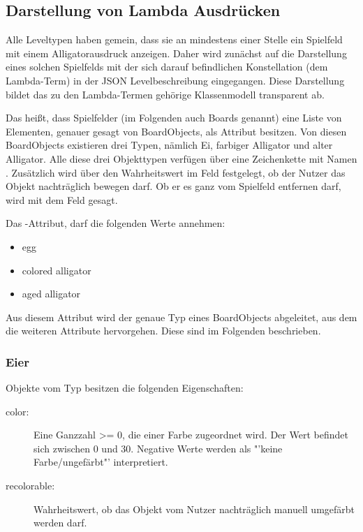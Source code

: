 \subsection{Darstellung von Lambda Ausdrücken}
Alle Leveltypen haben gemein, dass sie an mindestens einer Stelle ein Spielfeld mit einem Alligatorausdruck anzeigen.
Daher wird zunächst auf die Darstellung eines solchen Spielfelds mit der sich darauf befindlichen Konstellation (dem Lambda-Term) in der JSON Levelbeschreibung eingegangen.
Diese Darstellung bildet das zu den Lambda-Termen gehörige Klassenmodell transparent ab.


Das heißt, dass Spielfelder (im Folgenden auch Boards genannt) eine Liste von Elementen, genauer gesagt von BoardObjects, als Attribut besitzen.
Von diesen BoardObjects existieren drei Typen, nämlich Ei, farbiger Alligator und alter Alligator.
Alle diese drei Objekttypen verfügen über eine Zeichenkette mit Namen .
Zusätzlich wird über den Wahrheitswert im Feld  festgelegt, ob der Nutzer das Objekt nachträglich bewegen darf.
Ob er es ganz vom Spielfeld entfernen darf, wird mit dem Feld  gesagt.

Das -Attribut, darf die folgenden Werte annehmen:
\begin{itemize}
	\item egg
	\item colored alligator
	\item aged alligator
\end{itemize}
Aus diesem Attribut wird der genaue Typ eines BoardObjects abgeleitet, aus dem die weiteren Attribute hervorgehen.
Diese sind im Folgenden beschrieben.

\subsubsection{Eier}
Objekte vom Typ  besitzen die folgenden Eigenschaften:
\begin{description}
	\item[color:] Eine Ganzzahl >= 0, die einer Farbe zugeordnet wird. Der Wert befindet sich zwischen 0 und 30. Negative Werte werden als "'keine Farbe/ungefärbt"' interpretiert.
	\item[recolorable:] Wahrheitswert, ob das Objekt vom Nutzer nachträglich manuell umgefärbt werden darf.
\end{description}

